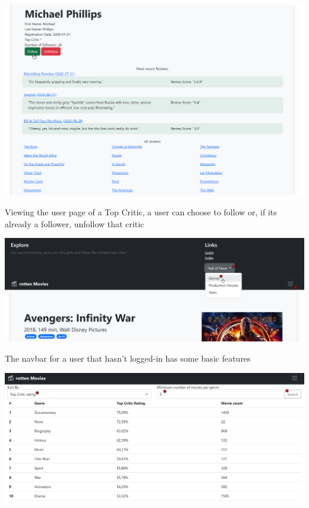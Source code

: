 \begin{center}
\includegraphics[scale=0.45]{../../../images/user_manual/follow_top_critic.png} 
\end{center}
\vspace{5pt}

Viewing the user page of a Top Critic, a user can choose to follow or, if its already a follower, unfollow that critic

\begin{center}
\includegraphics[scale=0.45]{../../../images/user_manual/unregistered_navbar.png} 
\end{center}
\vspace{5pt}

The navbar for a user that hasn't logged-in has some basic features

\begin{center}
\includegraphics[scale=0.45]{../../../images/user_manual/best_genres.png} 
\end{center}
\vspace{5pt}

